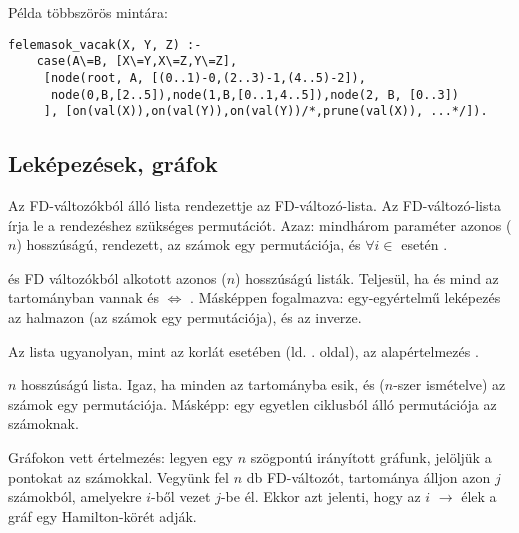 Példa többszörös mintára: 

\begin{verbatim}
felemasok_vacak(X, Y, Z) :-
    case(A\=B, [X\=Y,X\=Z,Y\=Z],
     [node(root, A, [(0..1)-0,(2..3)-1,(4..5)-2]),
      node(0,B,[2..5]),node(1,B,[0..1,4..5]),node(2, B, [0..3])
     ], [on(val(X)),on(val(Y)),on(val(Y))/*,prune(val(X)), ...*/]).
\end{verbatim}

\subsection{Leképezések, gráfok}

{}

Az  FD-változókból álló lista rendezettje az  FD-változó-lista. Az 
FD-változó-lista írja le a rendezéshez szükséges permutációt. Azaz: mindhárom
paraméter azonos ($n$) hosszúságú,  rendezett,  az  számok
egy permutációja, és $\forall i \in$  esetén . 

\medskip

{}

 és  FD változókból alkotott azonos ($n$) hosszúságú listák. Teljesül,
ha  és  mind az  tartományban vannak és  
$\Leftrightarrow$ . Másképpen fogalmazva:  egy-egyértelmű
leképezés az  halmazon (az  számok egy permutációja), és
 az  inverze.

Az  lista ugyanolyan, mint az  korlát
esetében (ld. \pageref{all_distinct}. oldal), az alapértelmezés
.

\medskip

{ }

 $n$ hosszúságú lista. Igaz, ha minden  az 
tartományba esik, és 
($n$-szer ismételve) az  számok egy permutációja. Másképp:  egy
egyetlen ciklusból álló permutációja az  számoknak.

Gráfokon vett értelmezés: legyen egy $n$ szögpontú irányított gráfunk,
jelöljük a pontokat az  számokkal. Vegyünk fel $n$ db FD-változót,
 tartománya álljon azon $j$ számokból, amelyekre $i$-ből vezet $j$-be él.
Ekkor  azt jelenti, hogy az $i$ $\rightarrow$  élek a
gráf egy Hamilton-körét adják.

